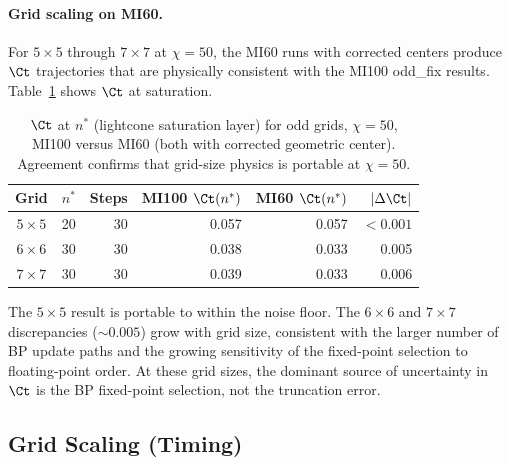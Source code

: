 \paragraph{Grid scaling on MI60.}
For $5\times5$ through $7\times7$ at $\chi=50$, the MI60 runs with corrected
centers produce $\Ct$ trajectories that are physically consistent with the
MI100 odd\_fix results.
Table~\ref{tab:mi60_grids} shows $\Ct$ at saturation.

\begin{table}[ht]
\centering
\caption{$\Ct$ at $n^*$ (lightcone saturation layer) for odd grids,
  $\chi=50$, MI100 versus MI60 (both with corrected geometric center).
  Agreement confirms that grid-size physics is portable at $\chi=50$.}
\label{tab:mi60_grids}
\begin{tabular}{ccrrrr}
\toprule
Grid & $n^*$ & Steps & MI100 $\Ct(n^*)$ & MI60 $\Ct(n^*)$ & $|\Delta\Ct|$ \\
\midrule
$5\times5$ & 20 & 30 & 0.057 & 0.057 & $<0.001$ \\
$6\times6$ & 30 & 30 & 0.038 & 0.033 & 0.005    \\
$7\times7$ & 30 & 30 & 0.039 & 0.033 & 0.006    \\
\bottomrule
\end{tabular}
\end{table}

The $5\times5$ result is portable to within the noise floor.
The $6\times6$ and $7\times7$ discrepancies ($\sim 0.005$) grow with
grid size, consistent with the larger number of BP update paths and the
growing sensitivity of the fixed-point selection to floating-point order.
At these grid sizes, the dominant source of uncertainty in $\Ct$ is the
BP fixed-point selection, not the truncation error.

\FloatBarrier   %
\subsection{Grid Scaling (Timing)}
\label{sec:grid_timing}

